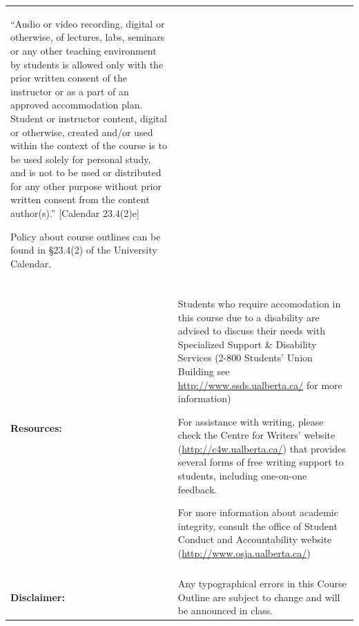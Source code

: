 \documentclass[12pt]{article}
\newcommand{\newsec}[1]{\\ \textbf{#1:}}
\begin{document}
\begin{longtable}{p{}p{}}
\vspace{12pt}

``Audio or video recording, digital or otherwise, of lectures, labs, seminars or any other teaching environment by students is allowed only with the prior written consent of the instructor or as a part of an approved accommodation plan. Student or instructor content, digital or otherwise, created and/or used within the context of the course is to be used solely for personal study, and is not to be used or distributed for any other purpose without prior written consent from the content author(s).'' [Calendar 23.4(2)e]

\vspace{12pt}

Policy about course outlines can be found in \S23.4(2) of the University Calendar.\\

\newsec{Resources}& Students who require accomodation in this course due to a disability are advised to discuss their needs with Specialized Support \& Disability Services (2-800 Students' Union Building see \url{http://www.ssds.ualberta.ca/} for more information)

\vspace{12pt}

For assistance with writing, please check the Centre for Writers' website (\url{http://c4w.ualberta.ca/}) that provides several forms of free writing support to students, including one-on-one feedback.

\vspace{12pt}

For more information about academic integrity, consult the office of Student Conduct and Accountability website (\url{http://www.osja.ualberta.ca/})\\

\newsec{Disclaimer} &Any typographical errors in this Course Outline are subject to change and will be announced in class.
\end{longtable}
\end{document}

